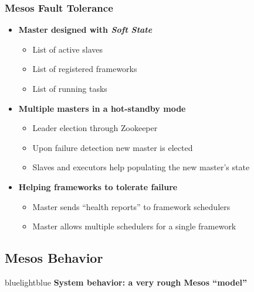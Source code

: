 \begin{frame}
\frametitle{Mesos Fault Tolerance}
\begin{itemize}
	\item {\bf Master designed with {\it Soft State}}
	\begin{itemize}
		\item List of active slaves
		\item List of registered frameworks
		\item List of running tasks
	\end{itemize}

\vspace{20pt}

	\item {\bf Multiple masters in a hot-standby mode}
	\begin{itemize}
		\item Leader election through Zookeeper
		\item Upon failure detection new master is elected
		\item Slaves and executors help populating the new master's state
	\end{itemize}

\vspace{20pt}

	\item {\bf Helping frameworks to tolerate failure}
	\begin{itemize}
		\item Master sends ``health reports'' to framework schedulers
		\item Master allows multiple schedulers for a single framework
	\end{itemize}
\end{itemize}
\end{frame}

\subsection{Mesos Behavior}
\begin{frame}
 \begin{colorblock}{blue}{lightblue}{ }
    \Large \textbf{System behavior: a very rough Mesos ``model''}
  \end{colorblock}
\end{frame}

